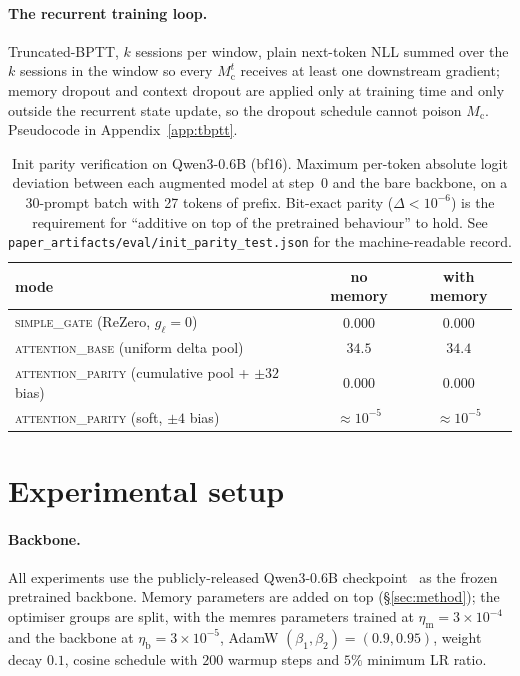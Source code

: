 \documentclass{article}
\newcommand{\Mc}{M_{\text{c}}}
\begin{document}
\paragraph{The recurrent training loop.}
Truncated-BPTT, $k$ sessions per window, plain next-token NLL
summed over the $k$ sessions in the window so every $\Mc^t$
receives at least one downstream gradient; memory dropout and
context dropout are applied only at training time and only outside
the recurrent state update, so the dropout schedule cannot poison
$\Mc$.  Pseudocode in Appendix~\ref{app:tbptt}.

\begin{table}[t]
\centering
\caption{Init parity verification on Qwen3-0.6B (bf16). Maximum
per-token absolute logit deviation between each augmented model at
step~0 and the bare backbone, on a 30-prompt batch with 27 tokens of
prefix. Bit-exact parity ($\Delta < 10^{-6}$) is the requirement for
``additive on top of the pretrained behaviour'' to hold. See
\texttt{paper\_artifacts/eval/init\_parity\_test.json} for the
machine-readable record.}
\label{tab:init_parity}
\begin{tabular}{lcc}
\toprule
mode & no memory & with memory \\
\midrule
\textsc{simple\_gate} (ReZero, $g_\ell{=}0$) & $0.000$ & $0.000$ \\
\textsc{attention\_base} (uniform delta pool)  & $34.5$ & $34.4$ \\
\textsc{attention\_parity} (cumulative pool + $\pm 32$ bias) & $0.000$ & $0.000$ \\
\textsc{attention\_parity} (soft, $\pm 4$ bias)              & $\approx 10^{-5}$ & $\approx 10^{-5}$ \\
\bottomrule
\end{tabular}
\end{table}

\section{Experimental setup}
\label{sec:setup}

\paragraph{Backbone.}
All experiments use the publicly-released Qwen3-0.6B
checkpoint~\cite{qwen3} as the frozen pretrained backbone. Memory
parameters are added on top (\S\ref{sec:method}); the optimiser
groups are split, with the memres parameters trained at $\eta_{\text{m}} = 3\!\times\!10^{-4}$
and the backbone at $\eta_{\text{b}} = 3\!\times\!10^{-5}$, AdamW
$(\beta_1, \beta_2) = (0.9, 0.95)$, weight decay $0.1$, cosine schedule with
$200$ warmup steps and $5\%$ minimum LR ratio.
\end{document}
